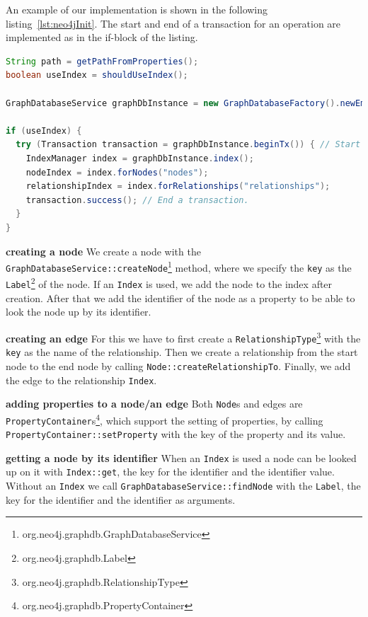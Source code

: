 An example of our implementation is shown in the following listing~\ref{lst:neo4jInit}.
The start and end of a transaction for an operation are implemented as in the if-block of the listing.

\begin{lstlisting}[language=Java,label={lst:neo4jInit},caption={Implementation of the initialisation and beginning of a transaction.},captionpos=b]
String path = getPathFromProperties();
boolean useIndex = shouldUseIndex();

GraphDatabaseService graphDbInstance = new GraphDatabaseFactory().newEmbeddedDatabase(new File(path)); // Creates to object to access the database.

if (useIndex) {
  try (Transaction transaction = graphDbInstance.beginTx()) { // Start a transaction.
    IndexManager index = graphDbInstance.index();
    nodeIndex = index.forNodes("nodes");
    relationshipIndex = index.forRelationships("relationships");
    transaction.success(); // End a transaction.
  }
}
\end{lstlisting}

\textbf{creating a node} \newline
We create a node with the \texttt{GraphDatabaseService::createNode}\footnote{org.neo4j.graphdb.GraphDatabaseService} method,
where we specify the \texttt{key} as the \texttt{Label}\footnote{org.neo4j.graphdb.Label} of the node.
If an \texttt{Index} is used,
we add the node to the index after creation.
After that we add the identifier of the node as a property to be able to look the node up by its identifier.

\textbf{creating an edge} \newline
For this we have to first create a \texttt{RelationshipType}\footnote{org.neo4j.graphdb.RelationshipType} with the \texttt{key} as the name of the relationship.
Then we create a relationship from the start node to the end node by calling \texttt{Node::createRelationshipTo}.
Finally,
we add the edge to the relationship \texttt{Index}.

\textbf{adding properties to a node/an edge} \newline
Both \texttt{Node}s and edges are \texttt{PropertyContainer}s\footnote{org.neo4j.graphdb.PropertyContainer},
which support the setting of properties,
by calling \texttt{PropertyContainer::setProperty} with the key of the property and its value.

\textbf{getting a node by its identifier} \newline
When an \texttt{Index} is used a node can be looked up on it with \texttt{Index::get},
the key for the identifier and the identifier value.
Without an \texttt{Index} we call \texttt{GraphDatabaseService::findNode} with the \texttt{Label},
the key for the identifier and the identifier as arguments.

